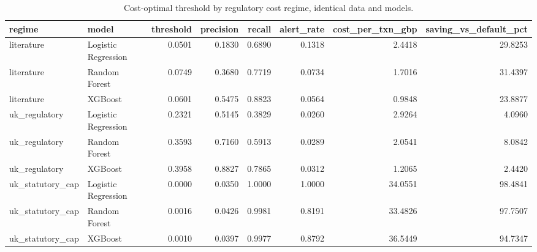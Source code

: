 \begin{table}
\caption{Cost-optimal threshold by regulatory cost regime, identical data and models.}
\label{tab:table2_regime_comparison}
\begin{tabular}{llrrrrrr}
\toprule
regime & model & threshold & precision & recall & alert\_rate & cost\_per\_txn\_gbp & saving\_vs\_default\_pct \\
\midrule
literature & Logistic Regression & 0.0501 & 0.1830 & 0.6890 & 0.1318 & 2.4418 & 29.8253 \\
literature & Random Forest & 0.0749 & 0.3680 & 0.7719 & 0.0734 & 1.7016 & 31.4397 \\
literature & XGBoost & 0.0601 & 0.5475 & 0.8823 & 0.0564 & 0.9848 & 23.8877 \\
uk\_regulatory & Logistic Regression & 0.2321 & 0.5145 & 0.3829 & 0.0260 & 2.9264 & 4.0960 \\
uk\_regulatory & Random Forest & 0.3593 & 0.7160 & 0.5913 & 0.0289 & 2.0541 & 8.0842 \\
uk\_regulatory & XGBoost & 0.3958 & 0.8827 & 0.7865 & 0.0312 & 1.2065 & 2.4420 \\
uk\_statutory\_cap & Logistic Regression & 0.0000 & 0.0350 & 1.0000 & 1.0000 & 34.0551 & 98.4841 \\
uk\_statutory\_cap & Random Forest & 0.0016 & 0.0426 & 0.9981 & 0.8191 & 33.4826 & 97.7507 \\
uk\_statutory\_cap & XGBoost & 0.0010 & 0.0397 & 0.9977 & 0.8792 & 36.5449 & 94.7347 \\
\bottomrule
\end{tabular}
\end{table}
